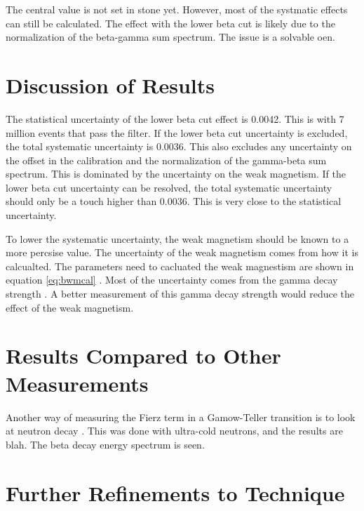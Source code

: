 \documentclass[main.tex]{subfiles}
\begin{document}
The central value is not set in stone yet.
However, most of the systmatic effects can still be calculated.
The effect with the lower beta cut is likely due to the normalization of the beta-gamma sum spectrum.
The issue is a solvable oen. 

\section{Discussion of Results}

The statistical uncertainty of the lower beta cut effect is 0.0042.
This is with 7 million events that pass the filter.
If the lower beta cut uncertainty is excluded, the total systematic uncertainty is 0.0036.
This also excludes any uncertainty on the offset in the calibration and the normalization of the gamma-beta sum spectrum.
This is dominated by the uncertainty on the weak magnetism.
If the lower beta cut uncertainty can be resolved, the total systematic uncertainty should only be a touch higher than 0.0036.
This is very close to the statistical uncertainty. 

To lower the systematic uncertainty, the weak magnetism should be known to a more percsise value.
The uncertainty of the weak magnetism comes from how it is calcualted.
The parameters need to cacluated the weak magnestism are shown in equation \ref{eq:bwmcal} .
Most of the uncertainty comes from the gamma decay strength \cite{Min11}.
A better measurement of this gamma decay strength would reduce the effect of the weak magnetism.

\section{Results Compared to Other Measurements}

Another way of measuring the Fierz term in a Gamow-Teller transition is to look at neutron decay \cite{Hic17}.
This was done with ultra-cold neutrons, and the results are blah.
The beta decay energy spectrum is seen. 

\section{Further Refinements to Technique}
\end{document}
